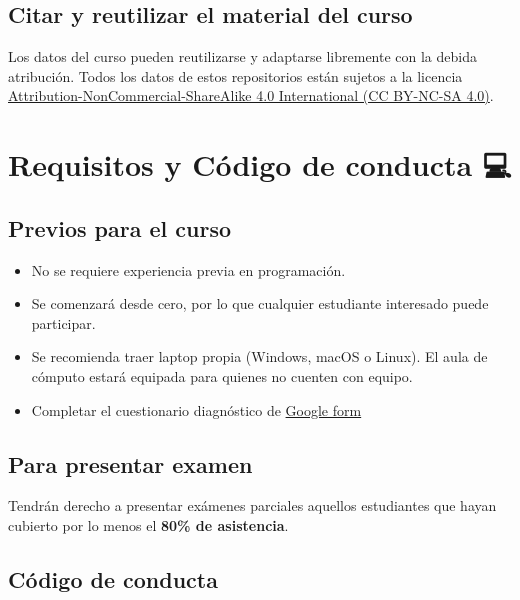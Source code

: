 \documentclass[
  spanish,
  12pt,
  letterpaper,
  DIV=11,
  numbers=noendperiod]{scrreprt}
\providecommand{\tightlist}{%
  \setlength{\itemsep}{0pt}\setlength{\parskip}{0pt}}
\begin{document}
\subsection*{\texorpdfstring{\textbf{Citar y reutilizar el material del
curso}}{Citar y reutilizar el material del curso}}\label{citar-y-reutilizar-el-material-del-curso}

Los datos del curso pueden reutilizarse y adaptarse libremente con la
debida atribución. Todos los datos de estos repositorios están sujetos a
la licencia
\href{https://creativecommons.org/licenses/by-nc-sa/4.0/}{Attribution-NonCommercial-ShareAlike
4.0 International (CC BY-NC-SA 4.0)}.

\section{Requisitos y Código de conducta 💻}

\subsection*{Previos para el curso}\label{previos-para-el-curso}

\begin{itemize}
\tightlist
\item
  No se requiere experiencia previa en programación.
\item
  Se comenzará desde cero, por lo que cualquier estudiante interesado
  puede participar.
\item
  Se recomienda traer laptop propia (Windows, macOS o Linux). El aula de
  cómputo estará equipada para quienes no cuenten con equipo.
\item
  Completar el cuestionario diagnóstico de
  {\href{https://forms.gle/xxpcC6z4UhiV9iER8}{Google form}}
\end{itemize}

\subsection*{Para presentar examen}\label{para-presentar-examen}

Tendrán derecho a presentar exámenes parciales aquellos estudiantes que
hayan cubierto por lo menos el {\textbf{80\% de asistencia}}.

\subsection*{Código de conducta}\label{cuxf3digo-de-conducta}
\end{document}

